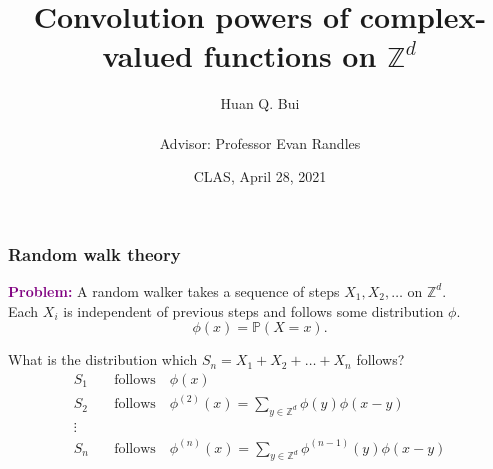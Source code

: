 \documentclass{beamer}
\title[Convolution powers...]
{
	Convolution powers
	of complex-valued functions on $\mathbb{Z}^d$
}
\author[Huan Bui] %
{Huan Q. Bui \\
	$\,$\\
	Advisor: Professor Evan Randles}
\institute[Colby College] %
{
}
\date{CLAS, April 28, 2021}
\theoremstyle{definition}
\begin{document}
 
\frame{\titlepage}




 









\begin{frame}
\frametitle{Random walk theory}

\textcolor{purple}{\textbf{Problem:}} A random walker  takes a sequence of steps $X_1, X_2,\dots$ on $\mathbb{Z}^d$.\\


Each $X_i$ is independent of previous steps and follows some distribution $\phi$. 
\begin{equation*}
\phi(x) = \mathbb{P}(X = x).
\end{equation*}


 What is the distribution which $S_n = X_1 + X_2 + \dots + X_n$ follows?
\begin{align*}
S_1  &\quad\text{follows}\quad \phi(x)\\
S_2  &\quad \text{follows} \quad \phi^{(2)}(x)= \sum_{y\in \mathbb{Z}^d} \phi(y)\phi(x-y)\\
\vdots &\\
S_n &\quad \text{follows} \quad \phi^{(n)}(x) = \sum_{y\in \mathbb{Z}^d}\phi^{(n-1)}(y) \phi (x-y)
\end{align*}
\pause
\centering\textcolor{purple}{}

\end{frame}
\end{document}
